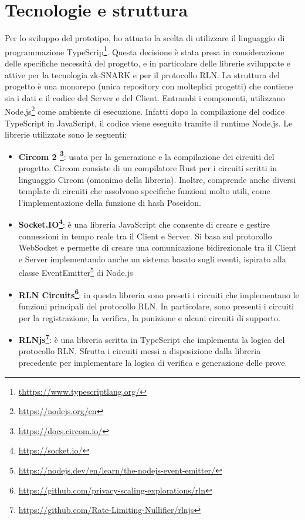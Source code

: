 \section{Tecnologie e struttura}
Per lo sviluppo del prototipo, ho attuato la scelta di utilizzare il linguaggio di programmazione
TypeScrip\footnote{\url{thttps://www.typescriptlang.org/}}. Questa decisione è stata presa in considerazione delle
specifiche necessità del progetto, e in particolare delle librerie sviluppate e attive per la tecnologia zk-SNARK e per
il protocollo RLN. La struttura del progetto è una monorepo (unica repository con molteplici progetti) che contiene sia
i dati e il codice del Server e del Client. Entrambi i componenti, utilizzano
Node.js\footnote{\url{https://nodejs.org/en}} come ambiente di esecuzione. Infatti dopo la compilazione del codice
TypeScript in JavaScript, il codice viene eseguito tramite il runtime Node.js. Le librerie utilizzate sono le seguenti:
\begin{itemize}
    \item \textbf{Circom 2 \footnote{\url{https://docs.circom.io/}}}: usata per la generazione e la compilazione dei
    circuiti del progetto. Circom consiste di un compilatore Rust per i circuiti scritti in linguaggio Circom (omonimo
    della libreria). Inoltre, comprende anche diversi template di circuiti che assolvono specifiche funzioni molto utili,
    come l'implementazione della funzione di hash Poseidon.
    \item \textbf{Socket.IO\footnote{\url{https://socket.io/}}}: è una libreria JavaScript che consente di creare e
    gestire connessioni in tempo reale tra il Client e Server. Si basa sul protocollo WebSocket e permette di creare una
    comunicazione bidirezionale tra il Client e Server implementando anche un sistema basato sugli eventi, ispirato alla
    classe EventEmitter\footnote{\url{https://nodejs.dev/en/learn/the-nodejs-event-emitter/}} di Node.js
    \item \textbf{RLN Circuits\footnote{\url{https://github.com/privacy-scaling-explorations/rln}}}: in questa libreria
    sono preseti i circuiti che implementano le funzioni principali del protocollo RLN. In particolare, sono presenti i
    circuiti per la registrazione, la verifica, la punizione e alcuni circuiti di supporto.
    \item \textbf{RLNjs\footnote{\url{https://github.com/Rate-Limiting-Nullifier/rlnjs}}}: è una libreria scritta in
    TypeScript che implementa la logica del protocollo RLN. Sfrutta i circuiti messi a disposizione dalla libreria
    precedente per implementare la logica di verifica e generazione delle prove.
\end{itemize}


